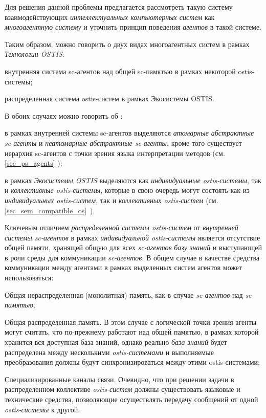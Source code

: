 Для решения данной проблемы предлагается рассмотреть такую систему взаимодействующих \textit{интеллектуальных компьютерных систем} как \textit{многоагентную систему} и уточнить принцип поведения \textit{агентов} в такой системе.

Таким образом, можно говорить о двух видах многоагентных систем в рамках \textit{Технологии OSTIS}:
\begin{textitemize}
	\item внутренняя система sc-агентов над общей sc-памятью в рамках некоторой ostis-системы;
	\item распределенная система ostis-систем в рамках Экосистемы OSTIS.
\end{textitemize}	

В обоих случаях можно говорить об :
\begin{textitemize}
	\item в рамках внутренней системы sc-агентов выделяются \textit{атомарные абстрактные sc-агенты} и \textit{неатомарные абстрактные sc-агенты}, кроме того существует иерархия sc-агентов с точки зрения языка интерпретации методов (см. \ref{sec_ps_agents} );
	\item в рамках \textit{Экосистемы OSTIS} выделяются как \textit{индивидуальные ostis-системы}, так и \textit{коллективные ostis-системы}, которые в свою очередь могут состоять как из \textit{индивидуальных ostis-систем}, так и \textit{коллективных ostis-систем} (см. \ref{sec_sem_compatible_os}~).
\end{textitemize}	

Ключевым отличием \textit{распределенной системы ostis-систем} от \textit{внутренней системы sc-агентов} в рамках \textit{индивидуальной ostis-системы} является отсутствие общей памяти, хранящей общую для всех \textit{sc-агентов} \textit{базу знаний} и выступающей в роли среды для коммуникации \textit{sc-агентов}. В общем случае в качестве средства коммуникации между агентами в рамках выделенных систем агентов может использоваться:
\begin{textitemize}
	\item Общая нераспределенная (монолитная) память, как в случае \textit{sc-агентов} над \textit{sc-памятью};
	\item Общая распределенная память. В этом случае с логической точки зрения агенты могут считать, что по-прежнему работают над общей памятью, в рамках которой хранится вся доступная база знаний, однако реально \textit{база знаний} будет распределена между несколькими \textit{ostis-системами} и выполняемые преобразования должны будут синхронизироваться между этими ostis-системами;
	\item Специализированные каналы связи. Очевидно, что при решении задачи в распределенном коллективе \textit{ostis-систем} должны существовать языковые и технические средства, позволяющие осуществлять передачу сообщений от одной \textit{ostis-системы} к другой.
\end{textitemize}

